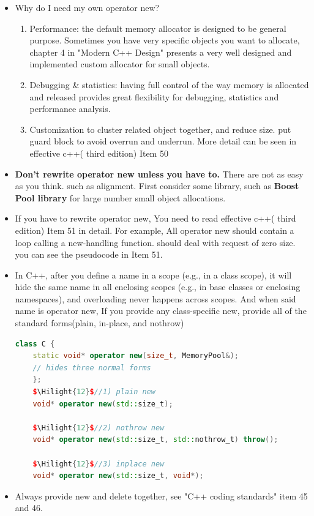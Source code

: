 \documentclass[a4paper,12pt,twoside]{book}
\newcommand{\Hilight}[1]{\makebox[0pt][l]{\color{yellow}\rule[-3pt]{#1em}{11pt}}}
\begin{document}
\begin{itemize}
	\item Why do I need my own operator new?
	\begin{enumerate}
		\item Performance: the default memory allocator is designed to be general purpose. Sometimes you have very specific objects you want to allocate, chapter 4 in "Modern C++ Design" presents a very well designed and implemented custom allocator for small objects.
		
		\item Debugging \& statistics: having full control of the way memory is allocated and released provides great flexibility for debugging, statistics and performance analysis.
		
		\item Customization to cluster related object together, and reduce size. put guard block to avoid overrun and underrun. More detail can be seen in effective c++( third edition) Item 50
	\end{enumerate}
	
	\item \textbf{Don't rewrite operator new unless you have to.} There are not as easy as you think. such as alignment. First consider some library, such as \textbf{Boost Pool library} for large number small object allocations. 
	
	\item If you have to rewrite operator new, You need to read  effective c++( third edition) Item 51 in detail. For example, All operator new should contain a loop calling a new-handling function.  should deal with request of zero size. you can see the pseudocode in Item 51.
	
	\item In C++, after you define a name in a scope (e.g., in a class scope), it will hide the same name in all enclosing scopes (e.g., in base classes or enclosing namespaces), and overloading never happens across scopes. And when said name is operator new, If you provide any class-specific new, provide all of the standard forms(plain, in-place, and nothrow)
	\begin{lstlisting}[frame=single, language=c++, mathescape=true]
	class C {
	static void* operator new(size_t, MemoryPool&);
	// hides three normal forms
	};
	$\Hilight{12}$//1) plain new
	void* operator new(std::size_t);
	
	$\Hilight{12}$//2) nothrow new
	void* operator new(std::size_t, std::nothrow_t) throw();
	
	$\Hilight{12}$//3) inplace new
	void* operator new(std::size_t, void*);
	\end{lstlisting}
	
	\item Always provide new and delete together, see "C++ coding standards" item 45 and 46.
\end{itemize}
\end{document}

